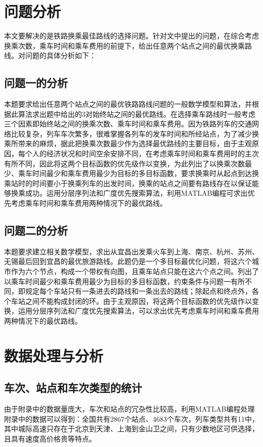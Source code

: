 \documentclass[UTF8]{ctexart}
\begin{document}
\section{问题分析}
本文要解决的是铁路换乘最佳路线的选择问题。针对文中提出的问题，在综合考虑换乘次数，乘车时间和乘车费用的前提下，给出任意两个站点之间的最优换乘路线。对问题的具体分析如下：

\subsection{问题一的分析}
本题要求给出任意两个站点之间的最优铁路路线问题的一般数学模型和算法，并根据此算法求出题中给出的3对始终站之间的最优路线。在选择乘车路线时一般考虑三个因素即始终站之间的换乘次数、乘车时间和乘车费用。因为铁路列车的交通网络比较复杂，列车车次繁多，很难掌握各列车的发车时间和所经站点，为了减少换乘所带来的麻烦，据此把换乘次数最少作为选择最优路线的主要目标，由于主观原因，每个人的经济状况和时间空余安排不同，在考虑乘车时间和乘车费用时的主次有所不同，因此将这两个目标函数的优先级作以变换，为此列出了以换乘次数最少、乘车时间最少和乘车费用最少为目标的多目标函数，要求换乘时从起点到达换乘站时的时间要小于换乘列车的出发时间，换乘的站点之间要有路线存在以保证能够换乘成功。运用分层序列法和广度优先搜索算法，利用MATLAB编程可求出优先考虑乘车时间和乘车费用两种情况下的最优路线。
\subsection{问题二的分析}
本题要求建立相关数学模型，求出从宜昌出发乘火车到上海、南京、杭州、苏州、无锡最后回到宜昌的最优旅游路线。此题仍是一个多目标最优化问题，将这六个城市作为六个节点，构成一个带权有向图，且乘车站点只能在这六个点之间。列出了以乘车时间最少和乘车费用最少为目标的多目标函数，约束条件与问题一有所不同，即规定每个车站只有一条进去的路线和一条出去的路线；除起点和终点外，各个车站之间不能构成封闭的环。由于主观原因，将这两个目标函数的优先级作以变换，运用分层序列法和广度优先搜索算法，可以求出优先考虑乘车时间和乘车费用两种情况下的最优路线。

\section{数据处理与分析}
\subsection{车次、站点和车次类型的统计}
由于附录中的数据量庞大，车次和站点的冗杂性比较高，利用MATLAB编程处理附录中的数据可以得到：全国共有2867个站点、4683个车次，列车类型共有11中，其中城际高速只存在于北京到天津、上海到金山卫之间，只有少数地区可供选择，且具有速度高价格贵等特点。
\end{document}
